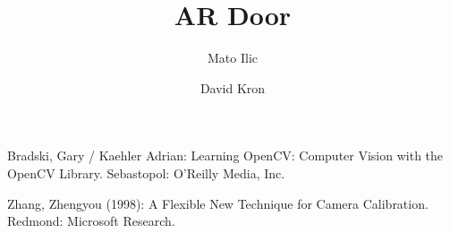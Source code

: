 \documentclass{llncs}
\begin{document}
%
\pagestyle{headings}  %
%
\title{AR Door}
%
%
\author{Mato Ilic \and David Kron}
%
%
%

\maketitle              %

\tableofcontents
\newpage


\newpage


\newpage


\newpage


\newpage

%
%
%
\newpage
\begin{thebibliography}{5}

Bradski, Gary / Kaehler Adrian:
Learning OpenCV: Computer Vision with the OpenCV Library.
Sebastopol: O'Reilly Media, Inc.

Zhang, Zhengyou (1998): A Flexible New Technique for Camera Calibration. 
Redmond: Microsoft Research.

\end{thebibliography}
\end{document}
